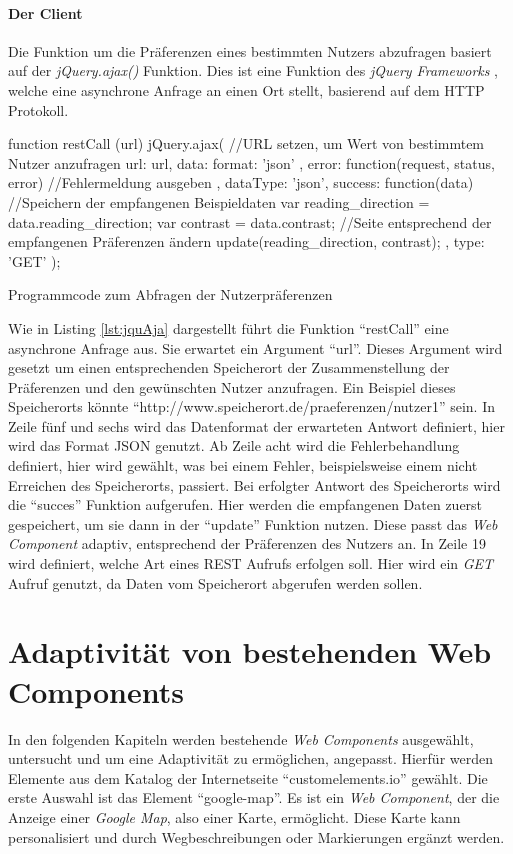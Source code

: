 \documentclass[12pt, paper=a4, bibtotoc, toc=listof, headsepline=true]{scrreprt}
\begin{document}
		\subsubsection{Der Client}
		Die Funktion um die Präferenzen eines bestimmten Nutzers abzufragen basiert auf der \emph{jQuery.ajax()} Funktion. Dies ist eine Funktion des \emph{jQuery Frameworks} , welche eine asynchrone Anfrage an einen Ort stellt, basierend auf dem \ac{HTTP} Protokoll.\cite[vgl.]{jquAja}
		\begin{listing}
			\begin{JavaScriptcode*}{}
function restCall (url){
   jQuery.ajax({
      //URL setzen, um Wert von bestimmtem Nutzer anzufragen
      url: url,
      data: {
         format: 'json'
      },
      error: function(request, status, error) {
         //Fehlermeldung ausgeben
      },
      dataType: 'json',
      success: function(data) {
         //Speichern der empfangenen Beispieldaten
         var reading_direction = data.reading_direction;
         var contrast = data.contrast;
         //Seite entsprechend der empfangenen Präferenzen ändern
         update(reading_direction, contrast);
      },
      type: 'GET'
   });
}
			\end{JavaScriptcode*}
			\caption{Programmcode zum Abfragen der Nutzerpräferenzen}
			\label{lst:jquAja}
		\end{listing}
		Wie in Listing \ref{lst:jquAja} dargestellt führt die Funktion \enquote{restCall} eine asynchrone Anfrage aus. Sie erwartet ein Argument \enquote{url}. Dieses Argument wird gesetzt um einen entsprechenden Speicherort der Zusammenstellung der Präferenzen und den gewünschten Nutzer anzufragen. Ein Beispiel dieses Speicherorts könnte \enquote{http://www.speicherort.de/praeferenzen/nutzer1} sein. In Zeile fünf und sechs wird das Datenformat der erwarteten Antwort definiert, hier wird das Format \ac{JSON} genutzt. Ab Zeile acht wird die Fehlerbehandlung definiert, hier wird gewählt, was bei einem Fehler, beispielsweise einem nicht Erreichen des Speicherorts, passiert. Bei erfolgter Antwort des Speicherorts wird die \enquote{succes} Funktion aufgerufen. Hier werden die empfangenen Daten zuerst gespeichert, um sie dann in der \enquote{update} Funktion nutzen. Diese passt das \emph{Web Component} adaptiv, entsprechend der Präferenzen des Nutzers an. In Zeile 19 wird definiert, welche Art eines \ac{REST} Aufrufs erfolgen soll. Hier wird ein \emph{GET} Aufruf genutzt, da Daten vom Speicherort abgerufen werden sollen.
\chapter{Adaptivität von bestehenden Web Components}
	In den folgenden Kapiteln werden bestehende \emph{Web Components} ausgewählt, untersucht und um eine Adaptivität zu ermöglichen, angepasst. Hierfür werden Elemente aus dem Katalog der Internetseite \enquote{customelements.io} gewählt.\cite{cusEleIo}
	Die erste Auswahl ist das Element \enquote{google-map}. Es ist ein \emph{Web Component}, der die Anzeige einer \emph{Google Map}, also einer Karte, ermöglicht. Diese Karte kann personalisiert und durch Wegbeschreibungen oder Markierungen ergänzt werden.\cite{gooMap}
\end{document}
